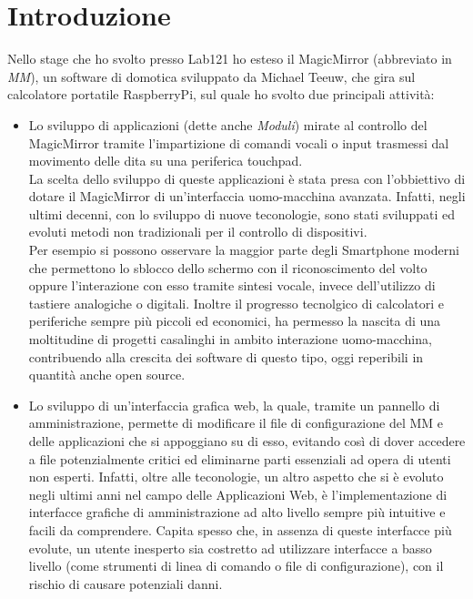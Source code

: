 \chapter*{Introduzione}

Nello stage che ho svolto presso Lab121 ho esteso il \cite{MagicMirror}MagicMirror (abbreviato in \emph{MM}), un software di domotica sviluppato da Michael Teeuw,
che gira sul calcolatore portatile RaspberryPi\cite{Raspberry}, sul quale ho svolto due principali attivit\`a:\\
\begin{itemize}
\item Lo sviluppo di applicazioni (dette anche \emph{Moduli}) mirate al controllo del
MagicMirror tramite l'impartizione di comandi vocali o input trasmessi dal movimento delle dita su
una periferica touchpad.\\
La scelta dello sviluppo di queste applicazioni \`e stata presa con l'obbiettivo di dotare il
MagicMirror di un'interfaccia uomo-macchina avanzata. Infatti, negli ultimi decenni, con lo sviluppo
di nuove teconologie, sono stati sviluppati ed evoluti metodi non tradizionali per il controllo di dispositivi.\\
Per esempio si possono osservare la maggior parte degli Smartphone moderni che permettono lo sblocco dello schermo con
il riconoscimento del volto oppure l'interazione con esso tramite sintesi vocale,
invece dell'utilizzo di tastiere analogiche o digitali.
Inoltre il progresso tecnolgico di calcolatori e periferiche sempre pi\`u piccoli ed economici, ha permesso
la nascita di una moltitudine di progetti casalinghi in ambito interazione uomo-macchina, contribuendo
alla crescita dei software di questo tipo, oggi reperibili in quantit\`a anche open source.\\[1\baselineskip]
\item Lo sviluppo di un'interfaccia grafica web, la quale, tramite un pannello di amministrazione,
 permette di modificare il file di configurazione del MM e delle applicazioni che si appoggiano su di esso,
evitando cos\`i di dover accedere
a file potenzialmente critici ed eliminarne parti essenziali ad opera di utenti non esperti.
Infatti, oltre alle teconologie, un altro aspetto che si \`e evoluto negli ultimi anni
nel campo delle Applicazioni Web, \`e l'implementazione di interfacce grafiche di amministrazione
ad alto livello sempre pi\`u intuitive e facili da comprendere.
Capita spesso che, in assenza di queste interfacce pi\`u evolute, un utente inesperto sia
costretto ad utilizzare interfacce a basso livello (come strumenti di linea di comando o file
di configurazione), con il rischio di causare potenziali danni.\\[2\baselineskip]
\end{itemize}

